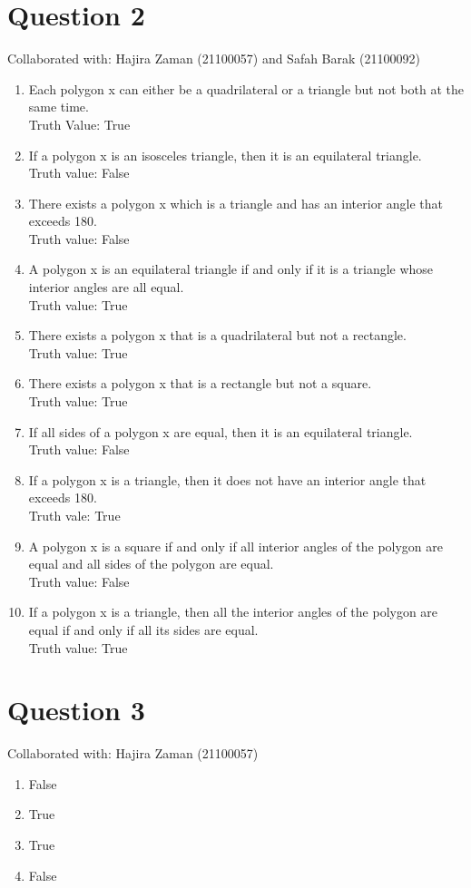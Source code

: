 \documentclass{article}
\begin{document}
\section{Question 2}
Collaborated with: Hajira Zaman (21100057) and Safah Barak (21100092)
\begin{enumerate}
\item %
Each polygon x can either be a quadrilateral or a triangle but not both at the same time. \\
Truth Value: True
\item %
If a polygon x is an isosceles triangle, then it is an equilateral triangle. \\
Truth value: False 

\item %
There exists a polygon x which is a triangle and has an interior angle that exceeds 180. \\
Truth value: False
\item %
A polygon x is an equilateral triangle if and only if it is a triangle whose interior angles are all equal. \\
Truth value: True
\item %
There exists a polygon x that is a quadrilateral but not a rectangle. \\
Truth value: True
\item %
There exists a polygon x that is a rectangle but not a square. \\
Truth value: True
\item %
If all sides of a polygon x are equal, then it is an equilateral triangle. \\
Truth value: False
\item %
If a polygon x is a triangle, then it does not have an interior angle that exceeds 180.\\
Truth vale: True
\item %
A polygon x is a square if and only if all interior angles of the polygon are equal and all sides of the polygon are equal. \\
Truth value: False
\item %
If a polygon x is a triangle, then all the interior angles of the polygon are equal if and only if all its sides are equal. \\
Truth value: True
\end{enumerate}

\section{Question 3}
Collaborated with: Hajira Zaman (21100057)
\begin{enumerate}
\item %
False
\item %
True
\item %
True
\item %
False
\end{enumerate}
\end{document}
